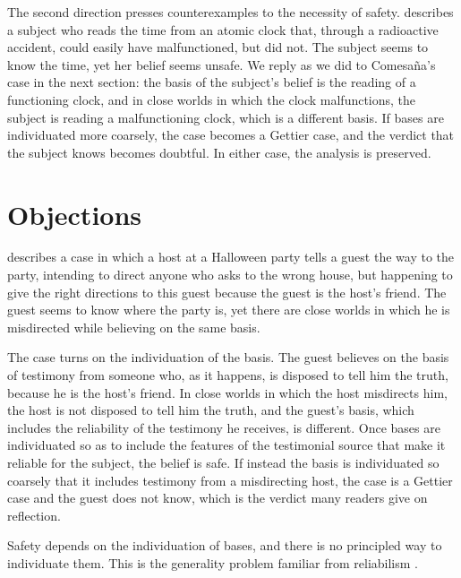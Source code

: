 \documentclass{situationist-preprint}
\begin{document}
The second direction presses counterexamples to the necessity of safety. \citet{Bogardus2014} describes a subject who reads the time from an atomic clock that, through a radioactive accident, could easily have malfunctioned, but did not. The subject seems to know the time, yet her belief seems unsafe. We reply as we did to Comesa{\~n}a's case in the next section: the basis of the subject's belief is the reading of a functioning clock, and in close worlds in which the clock malfunctions, the subject is reading a malfunctioning clock, which is a different basis. If bases are individuated more coarsely, the case becomes a Gettier case, and the verdict that the subject knows becomes doubtful. In either case, the analysis is preserved.

\section{Objections}

\begin{objection}
\citet{Comesana2005} describes a case in which a host at a Halloween party tells a guest the way to the party, intending to direct anyone who asks to the wrong house, but happening to give the right directions to this guest because the guest is the host's friend. The guest seems to know where the party is, yet there are close worlds in which he is misdirected while believing on the same basis.
\end{objection}

\begin{reply}
The case turns on the individuation of the basis. The guest believes on the basis of testimony from someone who, as it happens, is disposed to tell him the truth, because he is the host's friend. In close worlds in which the host misdirects him, the host is not disposed to tell him the truth, and the guest's basis, which includes the reliability of the testimony he receives, is different. Once bases are individuated so as to include the features of the testimonial source that make it reliable for the subject, the belief is safe. If instead the basis is individuated so coarsely that it includes testimony from a misdirecting host, the case is a Gettier case and the guest does not know, which is the verdict many readers give on reflection.
\end{reply}

\begin{objection}[Generality]
Safety depends on the individuation of bases, and there is no principled way to individuate them. This is the generality problem familiar from reliabilism \citep{ConeeFeldman1998}.
\end{objection}
\end{document}
